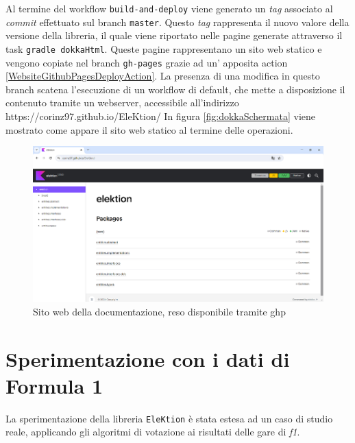 \documentclass[12pt,a4paper,openright,twoside]{book}
\begin{document}
Al termine del workflow \texttt{build-and-deploy} viene generato un \textit{tag}
associato al \textit{commit} effettuato sul branch \texttt{master}. Questo \textit{tag}
rappresenta il nuovo valore della versione della libreria, il quale viene riportato nelle pagine
generate attraverso il task \texttt{gradle dokkaHtml}.
Queste pagine rappresentano un sito web statico e vengono copiate nel branch \texttt{gh-pages} grazie ad un'
apposita action \ref{WebsiteGithubPagesDeployAction}. 
La presenza di una modifica in questo branch scatena l'esecuzione di un workflow di default,
che mette a disposizione il contenuto tramite un webserver, accessibile all'indirizzo https://corinz97.github.io/EleKtion/
In figura \ref{fig:dokkaSchermata} viene mostrato come appare il sito web statico al termine delle operazioni.

\begin{figure}
    \centering
     \includegraphics[scale=0.8]{figures/schermatadocumentazione.png}
     \caption{Sito web della documentazione, reso disponibile tramite \ac{ghp} }
     \label{fig:classifichegeneralireali2023figura}
 \end{figure}


\chapter{Sperimentazione con i dati di Formula 1}
La sperimentazione della libreria \texttt{EleKtion} è stata estesa ad un
caso di studio reale, applicando gli algoritmi di votazione ai risultati 
delle gare di \textit{\ac{f1}}.
\end{document}
